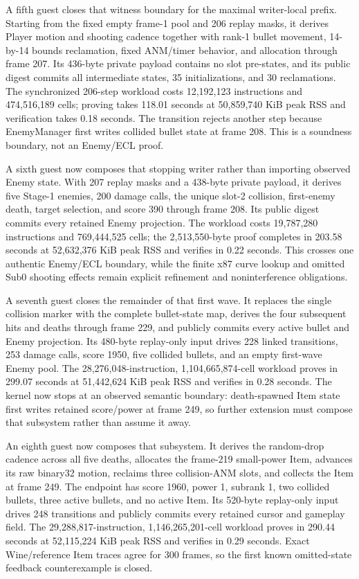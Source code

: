A fifth guest closes that witness boundary for the maximal writer-local prefix.
Starting from the fixed empty frame-1 pool and 206 replay masks, it derives
Player motion and shooting cadence together with rank-1 bullet movement,
14-by-14 bounds reclamation, fixed ANM/timer behavior, and allocation through
frame 207.  Its 436-byte private payload contains no slot pre-states, and its
public digest commits all intermediate states, 35 initializations, and 30
reclamations.  The synchronized 206-step workload costs 12,192,123 instructions
and 474,516,189 cells; proving takes 118.01 seconds at 50,859,740 KiB peak RSS and
verification takes 0.18 seconds.  The transition rejects another step because
EnemyManager first writes collided bullet state at frame 208.  This is a
soundness boundary, not an Enemy/ECL proof.

A sixth guest now composes that stopping writer rather than importing observed
Enemy state.  With 207 replay masks and a 438-byte private payload, it derives
five Stage-1 enemies, 200 damage calls, the unique slot-2 collision, first-enemy
death, target selection, and score 390 through frame 208.  Its public digest
commits every retained Enemy projection.  The workload costs 19,787,280
instructions and 769,444,525 cells; the 2,513,550-byte proof completes in
203.58 seconds at 52,632,376 KiB peak RSS and verifies in 0.22 seconds.  This
crosses one authentic Enemy/ECL boundary, while the finite x87 curve lookup and
omitted Sub0 shooting effects remain explicit refinement and noninterference
obligations.

A seventh guest closes the remainder of that first wave.  It replaces the
single collision marker with the complete bullet-state map, derives the four
subsequent hits and deaths through frame 229, and publicly commits every active
bullet and Enemy projection.  Its 480-byte replay-only input drives 228 linked
transitions, 253 damage calls, score 1950, five collided bullets, and an empty
first-wave Enemy pool.  The 28,276,048-instruction,
1,104,665,874-cell workload proves in 299.07 seconds at 51,442,624 KiB peak RSS
and verifies in 0.28 seconds.  The kernel now stops at an observed semantic
boundary: death-spawned Item state first writes retained score/power at frame
249, so further extension must compose that subsystem rather than assume it
away.

An eighth guest now composes that subsystem.  It derives the random-drop
cadence across all five deaths, allocates the frame-219 small-power Item,
advances its raw binary32 motion, reclaims three collision-ANM slots, and
collects the Item at frame 249.  The endpoint has score 1960, power 1, subrank
1, two collided bullets, three active bullets, and no active Item.  Its
520-byte replay-only input drives 248 transitions and publicly commits every
retained cursor and gameplay field.  The 29,288,817-instruction,
1,146,265,201-cell workload proves in 290.44 seconds at 52,115,224 KiB peak RSS
and verifies in 0.29 seconds.  Exact Wine/reference Item traces agree for 300
frames, so the first known omitted-state feedback counterexample is closed.

